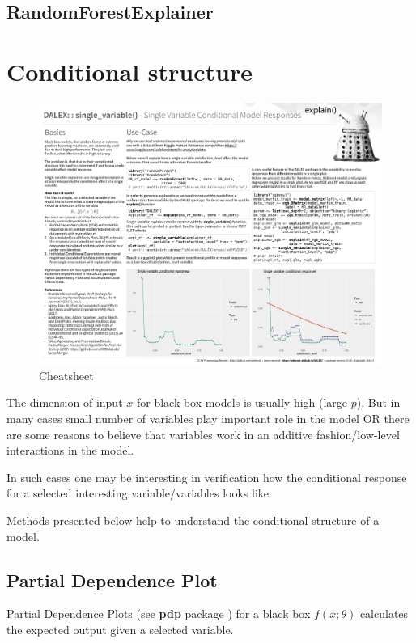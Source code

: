 \documentclass[]{book}
\theoremstyle{definition}
\theoremstyle{definition}
\theoremstyle{definition}
\theoremstyle{remark}
\begin{document}
\section{RandomForestExplainer}\label{randomforestexplainer}

\chapter{Conditional structure}\label{conditional-structure}

\begin{figure}
\centering
\includegraphics{images/DALEX_single_variable.png}
\caption{Cheatsheet}
\end{figure}

The dimension of input \(x\) for black box models is usually high (large
\(p\)). But in many cases small number of variables play important role
in the model OR there are some reasons to believe that variables work in
an additive fashion/low-level interactions in the model.

In such cases one may be interesting in verification how the conditional
response for a selected interesting variable/variables looks like.

Methods presented below help to understand the conditional structure of
a model.

\section{Partial Dependence Plot}\label{pdpchapter}

Partial Dependence Plots (see \textbf{pdp} package \citep{pdp}) for a
black box \(f(x; \theta)\) calculates the expected output given a
selected variable.
\end{document}
